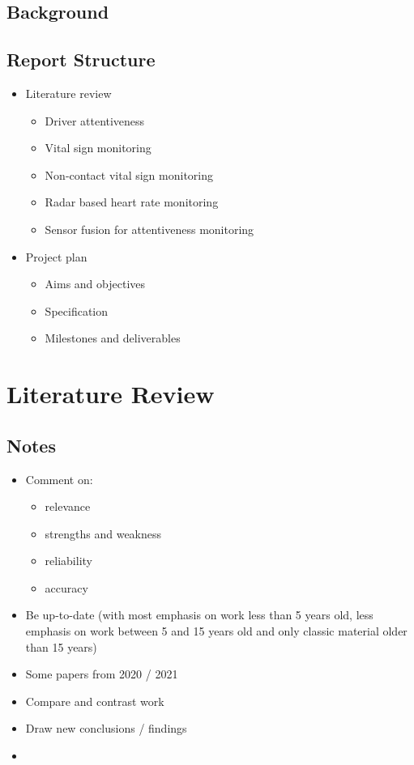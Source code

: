 \documentclass[11pt, parskip=half*,twoside=false]{scrbook}
\begin{document}
\section{Background}

\section{Report Structure}
\begin{itemize}
	\item Literature review
	\begin{itemize}
		\item Driver attentiveness
		\item Vital sign monitoring
		\item Non-contact vital sign monitoring
		\item Radar based heart rate monitoring
		\item Sensor fusion for attentiveness monitoring
	\end{itemize}
	\item Project plan
	\begin{itemize}
		\item Aims and objectives
		\item Specification
		\item Milestones and deliverables
		\end{itemize}
\end{itemize}

\chapter{Literature Review}
\section{Notes}
\begin{itemize}
	\item Comment on:
	\begin{itemize}
		\item relevance
		\item strengths and weakness
		\item reliability
		\item accuracy
	\end{itemize}
	\item Be up-to-date (with most emphasis on work less than 5 years old, less emphasis on work between 5 and 15 years old and only classic material older than 15 years)
	\item Some papers from 2020 / 2021
	\item Compare and contrast work
	\item Draw new conclusions / findings
	\item 
\end{itemize}
\end{document}
